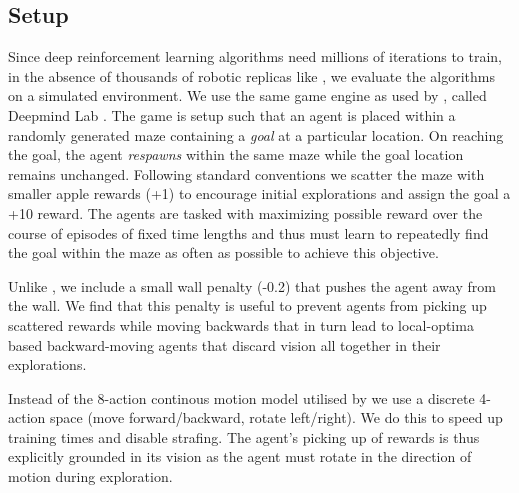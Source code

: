 \subsection{Setup}
Since deep reinforcement learning algorithms need millions of iterations to train, in the absence of thousands of robotic replicas like \cite{LePaKrISER2017}, we evaluate the algorithms on a simulated environment.
We use the same game engine as used by \cite{MiPaViICLR2017}, called Deepmind Lab \cite{BeLeTeARXIV2016}.
The game is setup such that an agent is placed within a randomly generated maze containing a \emph{goal} at a particular location.
On reaching the goal, the agent \emph{respawns} within the same maze while the goal location remains unchanged. 
Following standard conventions we scatter the maze with smaller apple rewards (+1) to encourage initial explorations and assign the goal a +10 reward.
The agents are tasked with maximizing possible reward over the course of episodes of fixed time lengths and thus must learn to repeatedly find the goal within the maze as often as possible to achieve this objective.

Unlike \cite{MiPaViICLR2017}, we include a small wall penalty (-0.2) that pushes the agent away from the wall. We find that this penalty is useful to prevent agents from picking up scattered rewards while moving backwards that in turn lead to local-optima based backward-moving agents that discard vision all together in their explorations.


Instead of the 8-action continous motion model utilised by \cite{MiPaViICLR2017} we use a discrete 4-action space (move forward/backward, rotate left/right). We do this to speed up training times and disable strafing. The agent's picking up of rewards is thus explicitly grounded in its vision as the agent must rotate in the direction of motion during exploration.

